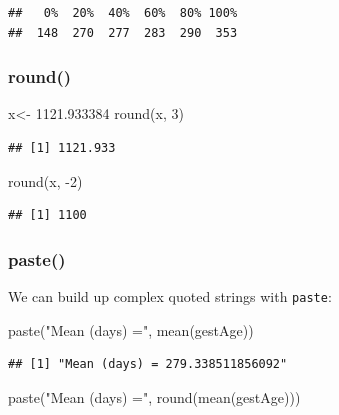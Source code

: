 \documentclass[
]{book}
\newenvironment{Shaded}{\begin{snugshade}}{\end{snugshade}}
\newcommand{\DecValTok}[1]{\textcolor[rgb]{0.00,0.00,0.81}{#1}}
\newcommand{\FloatTok}[1]{\textcolor[rgb]{0.00,0.00,0.81}{#1}}
\newcommand{\FunctionTok}[1]{\textcolor[rgb]{0.00,0.00,0.00}{#1}}
\newcommand{\NormalTok}[1]{#1}
\newcommand{\OtherTok}[1]{\textcolor[rgb]{0.56,0.35,0.01}{#1}}
\newcommand{\SpecialCharTok}[1]{\textcolor[rgb]{0.00,0.00,0.00}{#1}}
\newcommand{\StringTok}[1]{\textcolor[rgb]{0.31,0.60,0.02}{#1}}
\begin{document}
\begin{verbatim}
##   0%  20%  40%  60%  80% 100% 
##  148  270  277  283  290  353
\end{verbatim}

\hypertarget{round}{%
\subsubsection*{round()}\label{round}}

\begin{Shaded}
\begin{Highlighting}[]
\NormalTok{x}\OtherTok{\textless{}{-}} \FloatTok{1121.933384}
\FunctionTok{round}\NormalTok{(x, }\DecValTok{3}\NormalTok{)}
\end{Highlighting}
\end{Shaded}

\begin{verbatim}
## [1] 1121.933
\end{verbatim}

\begin{Shaded}
\begin{Highlighting}[]
\FunctionTok{round}\NormalTok{(x, }\SpecialCharTok{{-}}\DecValTok{2}\NormalTok{)}
\end{Highlighting}
\end{Shaded}

\begin{verbatim}
## [1] 1100
\end{verbatim}

\hypertarget{paste}{%
\subsubsection*{paste()}\label{paste}}

We can build up complex quoted strings with \texttt{paste}:

\begin{Shaded}
\begin{Highlighting}[]
\FunctionTok{paste}\NormalTok{(}\StringTok{"Mean (days) ="}\NormalTok{, }\FunctionTok{mean}\NormalTok{(gestAge))}
\end{Highlighting}
\end{Shaded}

\begin{verbatim}
## [1] "Mean (days) = 279.338511856092"
\end{verbatim}

\begin{Shaded}
\begin{Highlighting}[]
\FunctionTok{paste}\NormalTok{(}\StringTok{"Mean (days) ="}\NormalTok{, }\FunctionTok{round}\NormalTok{(}\FunctionTok{mean}\NormalTok{(gestAge)))}
\end{Highlighting}
\end{Shaded}
\end{document}

